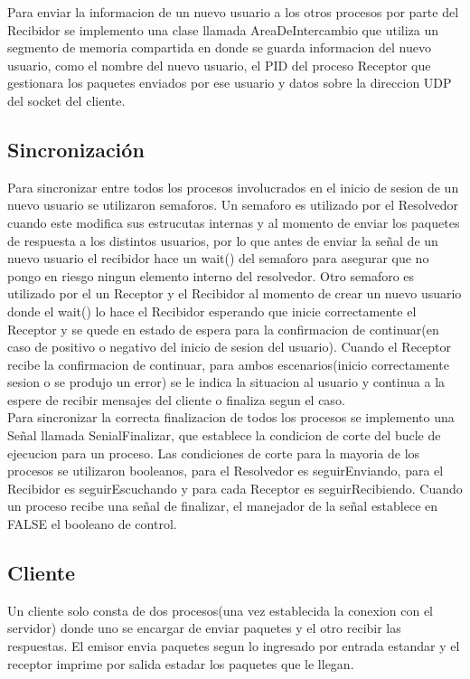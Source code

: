 \documentclass[a4paper,12pt,titlepage]{article}
\begin{document}
Para enviar la informacion de un nuevo usuario a los otros procesos por parte del Recibidor se implemento una clase llamada AreaDeIntercambio 
que utiliza un segmento de memoria compartida en donde se guarda informacion del nuevo usuario, como el nombre del nuevo usuario, el PID del 
proceso Receptor que gestionara los paquetes enviados por ese usuario y datos sobre la direccion UDP del socket del cliente.\\

\subsection{Sincronización}

Para sincronizar entre todos los procesos involucrados en el inicio de sesion de un nuevo usuario se utilizaron semaforos. Un semaforo es utilizado 
por el Resolvedor cuando este modifica sus estrucutas internas y al momento de enviar los paquetes de respuesta a los distintos usuarios, por lo 
que antes de enviar la señal de un nuevo usuario el recibidor hace un wait() del semaforo para asegurar que no pongo en riesgo ningun elemento interno 
del resolvedor. Otro semaforo es utilizado por el un Receptor y el Recibidor al momento de crear un nuevo usuario donde el wait() lo hace el Recibidor 
esperando que inicie correctamente el Receptor y se quede en estado de espera para la confirmacion de continuar(en caso de positivo o negativo del inicio 
de sesion del usuario). Cuando el Receptor recibe la confirmacion de continuar, para ambos escenarios(inicio correctamente sesion o se produjo un error) se le indica la situacion al usuario y continua a la espere de recibir mensajes del cliente o finaliza segun el caso.\\

Para sincronizar la correcta finalizacion de todos los procesos se implemento una Señal llamada SenialFinalizar, que establece la condicion de corte del bucle de ejecucion para un proceso. Las condiciones de corte para la mayoria de los procesos se utilizaron booleanos, para el Resolvedor es seguirEnviando, para el Recibidor es seguirEscuchando y para cada Receptor es seguirRecibiendo. Cuando un proceso recibe una señal de finalizar, el manejador de la señal establece en FALSE el booleano de control.

\subsection{Cliente}
Un cliente solo consta de dos procesos(una vez establecida la conexion con el servidor) donde uno se encargar de enviar paquetes y el otro recibir las respuestas. 
El emisor envia paquetes segun lo ingresado por entrada estandar y el receptor imprime por salida estadar los paquetes que le llegan.
\end{document}
